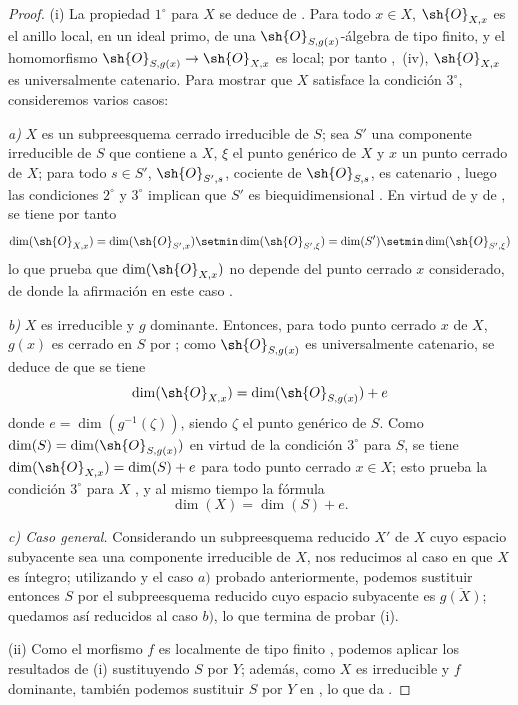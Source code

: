\begin{proof}
(i) La propiedad $1^\circ$ para $X$ se deduce de .
Para todo $x\in X$, $\sh{O}_{X,x}$ es el anillo local, en un ideal primo, de una $\sh{O}_{S,g(x)}$-álgebra de tipo finito, y el homomorfismo $\sh{O}_{S,g(x)}\to\sh{O}_{X,x}$
es local; por tanto ,~(iv), $\sh{O}_{X,x}$ es universalmente catenario.
Para mostrar que $X$ satisface la condición $3^\circ$, consideremos varios casos:

\emph{a)} $X$ es un subpreesquema cerrado irreducible de $S$; sea $S'$ una componente irreducible de $S$ que contiene a $X$, $\xi$ el punto genérico de $X$ y $x$ un punto cerrado de $X$; para todo $s\in S'$, $\sh{O}_{S',s}$, cociente de $\sh{O}_{S,s}$, es catenario , luego las condiciones $2^\circ$ y $3^\circ$ implican que $S'$ es biequidimensional .
En virtud de  y de , se tiene por tanto
\[
  \dim(\sh{O}_{X,x})=\dim(\sh{O}_{S',x})\setmin\dim(\sh{O}_{S',\xi})=\dim(S')\setmin\dim(\sh{O}_{S',\xi})
\]
lo que prueba que $\dim(\sh{O}_{X,x})$ no depende del punto cerrado $x$ considerado, de donde la afirmación en este caso .

\emph{b)} $X$ es irreducible y $g$ dominante.
Entonces, para todo punto cerrado $x$ de $X$, $g(x)$ es cerrado en $S$ por ; como $\sh{O}_{S,g(x)}$ es universalmente catenario, se deduce de  que se tiene
\[
  \dim(\sh{O}_{X,x})=\dim(\sh{O}_{S,g(x)})+e
\]
donde $e=\dim(g^{-1}(\zeta))$, siendo $\zeta$ el punto genérico de $S$.
Como $\dim(S)=\dim(\sh{O}_{S,g(x)})$ en virtud de la condición $3^\circ$ para $S$, se tiene $\dim(\sh{O}_{X,x})=\dim(S)+e$ para todo punto cerrado $x\in X$; esto prueba la condición $3^\circ$ para $X$ , y al mismo tiempo la fórmula
\begin{equation}
\label{IV.10.6.1.4}
\tag{10.6.1.4}
\dim(X)=\dim(S)+e.
\end{equation}

\emph{c) Caso general.}
Considerando un subpreesquema reducido $X'$ de $X$ cuyo espacio subyacente sea una componente irreducible de $X$, nos reducimos al caso en que $X$ es íntegro; utilizando  y el caso $a)$ probado anteriormente, podemos sustituir entonces $S$ por el subpreesquema reducido cuyo espacio subyacente es $\overline{g(X)}$; quedamos así reducidos al caso $b)$, lo que termina de probar (i).

(ii) Como el morfismo $f$ es localmente de tipo finito , podemos aplicar los resultados de (i) sustituyendo $S$ por $Y$; además, como $X$ es irreducible y $f$ dominante, también podemos sustituir $S$ por $Y$ en , lo que da .


\end{proof}
